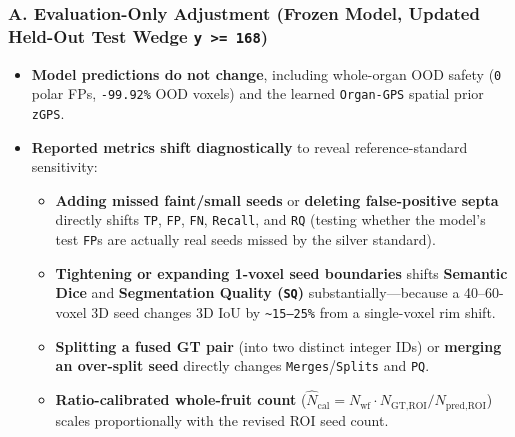\documentclass[10pt,a4paper]{article}
\renewcommand{\_}{\origunderscore\allowbreak}
\begin{document}
\subsubsection*{A. Evaluation-Only Adjustment (Frozen Model, Updated Held-Out Test Wedge \texttt{y >= 168})}
\begin{itemize}
\item \textbf{Model predictions do not change}, including whole-organ OOD safety (\texttt{0} polar FPs, \texttt{-99.92\%} OOD voxels) and the learned \texttt{Organ-GPS} spatial prior \texttt{z\_GPS}.
\item \textbf{Reported metrics shift diagnostically} to reveal reference-standard sensitivity:
\begin{itemize}
\item \textbf{Adding missed faint/\allowbreak{}small seeds} or \textbf{deleting false-positive septa} directly shifts \texttt{TP}, \texttt{FP}, \texttt{FN}, \texttt{Recall}, and \texttt{RQ} (testing whether the model's test \texttt{FP}s are actually real seeds missed by the silver standard).
\item \textbf{Tightening or expanding 1-voxel seed boundaries} shifts \textbf{Semantic Dice} and \textbf{Segmentation Quality (\texttt{SQ})} substantially---because a 40--60-voxel 3D seed changes 3D IoU by \texttt{\textasciitilde{}15--25\%} from a single-voxel rim shift.
\item \textbf{Splitting a fused GT pair} (into two distinct integer IDs) or \textbf{merging an over-split seed} directly changes \texttt{Merges}/\allowbreak{}\texttt{Splits} and \texttt{PQ}.
\item \textbf{Ratio-calibrated whole-fruit count} ($\hat{N}_{\text{cal}} = N_{\text{wf}} \cdot N_{\text{GT,ROI}} / N_{\text{pred,ROI}}$) scales proportionally with the revised ROI seed count.
\end{itemize}
\end{itemize}
\end{document}
